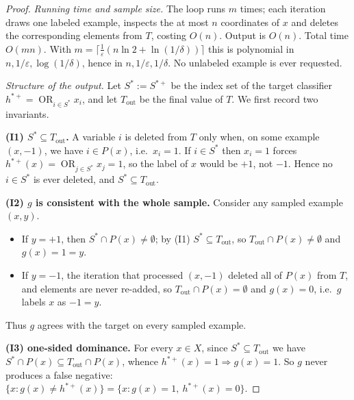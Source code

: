 \documentclass{amsart}
\theoremstyle{definition}
\DeclareMathOperator*{\OR}{OR}
\newcommand{\eps}{\varepsilon}
\begin{document}
\begin{proof}
\emph{Running time and sample size.} The loop runs $m$ times; each iteration
draws one labeled example, inspects the at most $n$ coordinates of $x$ and
deletes the corresponding elements from $T$, costing $O(n)$. Output is $O(n)$.
Total time $O(mn)$. With
$m=\lceil\frac1\eps(n\ln2+\ln(1/\delta))\rceil$ this is polynomial in
$n,1/\eps,\log(1/\delta)$, hence in $n,1/\eps,1/\delta$. No unlabeled example is
ever requested.

\emph{Structure of the output.} Let $S^\ast:=S^{\ast+}$ be the index set of the
target classifier $h^{\ast+}=\OR_{i\in S^\ast}x_i$, and let $T_{\mathrm{out}}$ be
the final value of $T$. We first record two invariants.

\textbf{(I1) $S^\ast\subseteq T_{\mathrm{out}}$.}
A variable $i$ is deleted from $T$ only when, on some example $(x,-1)$, we have
$i\in P(x)$, i.e.\ $x_i=1$. If $i\in S^\ast$ then $x_i=1$ forces
$h^{\ast+}(x)=\OR_{j\in S^\ast}x_j=1$, so the label of $x$ would be $+1$, not
$-1$. Hence no $i\in S^\ast$ is ever deleted, and $S^\ast\subseteq
T_{\mathrm{out}}$.

\textbf{(I2) $g$ is consistent with the whole sample.} Consider any sampled
example $(x,y)$.
\begin{itemize}
\item If $y=+1$, then $S^\ast\cap P(x)\neq\emptyset$; by (I1)
$S^\ast\subseteq T_{\mathrm{out}}$, so $T_{\mathrm{out}}\cap P(x)\neq\emptyset$
and $g(x)=1=y$.
\item If $y=-1$, the iteration that processed $(x,-1)$ deleted all of $P(x)$
from $T$, and elements are never re-added, so
$T_{\mathrm{out}}\cap P(x)=\emptyset$ and $g(x)=0$, i.e.\ $g$ labels $x$ as
$-1=y$.
\end{itemize}
Thus $g$ agrees with the target on every sampled example.

\textbf{(I3) one-sided dominance.} For every $x\in X$, since
$S^\ast\subseteq T_{\mathrm{out}}$ we have
$S^\ast\cap P(x)\subseteq T_{\mathrm{out}}\cap P(x)$, whence
$h^{\ast+}(x)=1\Rightarrow g(x)=1$. So $g$ never produces a false negative:
$\{x:g(x)\neq h^{\ast+}(x)\}=\{x:g(x)=1,\ h^{\ast+}(x)=0\}$.


\end{proof}
\end{document}
